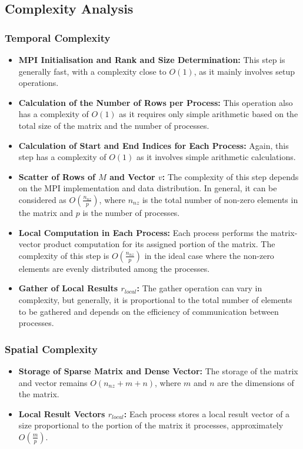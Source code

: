 \documentclass[12pt,oneside]{book} %
\begin{document}
\subsection{Complexity Analysis}
\subsubsection{Temporal Complexity}
\begin{itemize}
    \item \textbf{MPI Initialisation and Rank and Size Determination:} This step is generally fast, with a complexity close to \( O(1) \), as it mainly involves setup operations.
    \item \textbf{Calculation of the Number of Rows per Process:} This operation also has a complexity of \( O(1) \) as it requires only simple arithmetic based on the total size of the matrix and the number of processes.
    \item \textbf{Calculation of Start and End Indices for Each Process:} Again, this step has a complexity of \( O(1) \) as it involves simple arithmetic calculations.
    \item \textbf{Scatter of Rows of \( M \) and Vector \( v \):} The complexity of this step depends on the MPI implementation and data distribution. In general, it can be considered as \( O(\frac{n_{nz}}{p}) \), where \( n_{nz} \) is the total number of non-zero elements in the matrix and \( p \) is the number of processes.
    \item \textbf{Local Computation in Each Process:} Each process performs the matrix-vector product computation for its assigned portion of the matrix. The complexity of this step is \( O(\frac{n_{nz}}{p}) \) in the ideal case where the non-zero elements are evenly distributed among the processes.
    \item \textbf{Gather of Local Results \( r_{local} \):} The gather operation can vary in complexity, but generally, it is proportional to the total number of elements to be gathered and depends on the efficiency of communication between processes.
\end{itemize}

\subsubsection{Spatial Complexity}

\begin{itemize}
    \item \textbf{Storage of Sparse Matrix and Dense Vector:} The storage of the matrix and vector remains \( O(n_{nz} + m + n) \), where \( m \) and \( n \) are the dimensions of the matrix.
    \item \textbf{Local Result Vectors \( r_{local} \):} Each process stores a local result vector of a size proportional to the portion of the matrix it processes, approximately \( O(\frac{m}{p}) \).
\end{itemize}
\end{document}
